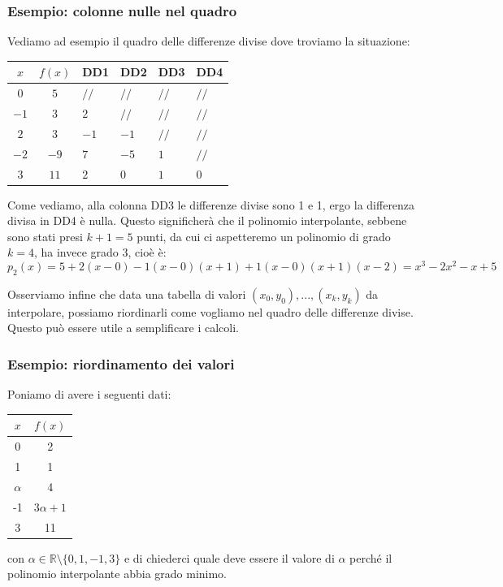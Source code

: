 \documentclass[a4paper,11pt]{article}
\begin{document}
\subsubsection{Esempio: colonne nulle nel quadro}
Vediamo ad esempio il quadro delle differenze divise dove troviamo la situazione:
\begin{table}[H]
	\center 
	\begin{tabular} { c | c | p{1cm}  p{1cm} p{1cm} p{1cm} }
		$x$ & $f(x)$ & DD1 & DD2 & DD3 & DD4\\
		\hline
		$0 $ & $ 5 $ & $ // $ & $ // $ & $ // $ & $ // $ \\
		$-1 $ & $ 3 $ & $ 2 $ & $ // $ & $ // $ & $ // $ \\
		$2 $ & $ 3 $ & $ -1 $ & $ -1 $ & $ // $ & $ // $ \\
		$-2 $ & $ -9 $ & $ 7 $ & $-5 $ & $ 1 $ & $ // $ \\
		$3 $ & $ 11 $ & $ 2 $ & $ 0 $ & $ 1 $ & $ 0 $
	\end{tabular}
\end{table}

Come vediamo, alla colonna DD3 le differenze divise sono 1 e 1, ergo la differenza divisa in DD4 è nulla.
Questo significherà che il polinomio interpolante, sebbene sono stati presi $k + 1 = 5$ punti, da cui ci aspetteremo un polinomio di grado $k = 4$, ha invece grado $3$, cioè è:
$$
p_2(x) = 5 + 2 (x - 0) - 1 (x - 0)(x + 1) + 1 (x - 0)(x + 1)(x - 2) = x^3 - 2x^2 - x + 5
$$

\par\smallskip

Osserviamo infine che data una tabella di valori $(x_0, y_0), ..., (x_k, y_k)$ da interpolare, possiamo riordinarli come vogliamo nel quadro delle differenze divise.
Questo può essere utile a semplificare i calcoli.

\newpage

\subsubsection{Esempio: riordinamento dei valori}
Poniamo di avere i seguenti dati:
\begin{table}[H]
	\center 
	\begin{tabular} { c | c }
		$x$ & $f(x)$ \\
		\hline
		0 & 2 \\
		1 & 1 \\
		$\alpha$ & 4 \\
		-1 & $3 \alpha + 1$ \\
		3 & 11 
	\end{tabular}
\end{table}
con $\alpha \in \mathbb{R} \setminus \{ 0, 1, -1, 3 \}$ e di chiederci quale deve essere il valore di $\alpha$ perché il polinomio interpolante abbia grado minimo.
\end{document}
